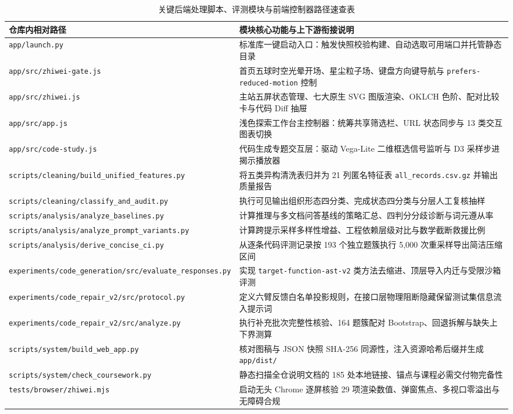 {\setlength{\parfillskip}{0pt plus 1fil}
\begin{table}[!htbp]
\centering
\caption{关键后端处理脚本、评测模块与前端控制器路径速查表}\label{tab:app-g-modmap}
\ReportTableStyle
\fontsize{9.6bp}{11.8bp}\selectfont
\begin{tabularx}{\linewidth}{@{}>{\raggedright\arraybackslash}p{6.2cm} >{\raggedright\arraybackslash}X@{}}
\toprule
\textbf{仓库内相对路径} & \textbf{模块核心功能与上下游衔接说明} \\
\midrule
\texttt{app/launch.py} & 标准库一键启动入口：触发快照校验构建、自动选取可用端口并托管静态目录 \\
\texttt{app/src/zhiwei-gate.js} & 首页五球时空光晕开场、星尘粒子场、键盘方向键导航与 \texttt{prefers-reduced-motion} 控制 \\
\texttt{app/src/zhiwei.js} & 主站五屏状态管理、七大原生 SVG 图版渲染、OKLCH 色阶、配对比较卡与代码 Diff 抽屉 \\
\texttt{app/src/app.js} & 浅色探索工作台主控制器：统筹共享筛选栏、URL 状态同步与 13 类交互图表切换 \\
\texttt{app/src/code-study.js} & 代码生成专题交互层：驱动 Vega-Lite 二维框选信号监听与 D3 采样步进揭示播放器 \\
\texttt{scripts/cleaning/build\_unified\_features.py} & 将五类异构清洗表归并为 21 列匿名特征表 \texttt{all\_records.csv.gz} 并输出质量报告 \\
\texttt{scripts/cleaning/classify\_and\_audit.py} & 执行可见输出组织形态四分类、完成状态四分类与分层人工复核抽样 \\
\texttt{scripts/analysis/analyze\_baselines.py} & 计算推理与多文档问答基线的策略汇总、四判分分歧诊断与词元遵从率 \\
\texttt{scripts/analysis/analyze\_prompt\_variants.py} & 计算跨提示采样多样性增益、工程依赖层级对比与数学截断救援比例 \\
\texttt{scripts/analysis/derive\_concise\_ci.py} & 从逐条代码评测记录按 193 个独立题簇执行 5,000 次重采样导出简洁压缩区间 \\
\texttt{experiments/code\_generation/src/evaluate\_responses.py} & 实现 \texttt{target-function-ast-v2} 类方法去缩进、顶层导入内迁与受限沙箱评测 \\
\texttt{experiments/code\_repair\_v2/src/protocol.py} & 定义六臂反馈白名单投影规则，在接口层物理阻断隐藏保留测试集信息流入提示词 \\
\texttt{experiments/code\_repair\_v2/src/analyze.py} & 执行补充批次完整性核验、164 题簇配对 Bootstrap、回退拆解与缺失上下界测算 \\
\texttt{scripts/system/build\_web\_app.py} & 核对图稿与 JSON 快照 SHA-256 同源性，注入资源哈希后缀并生成 \texttt{app/dist/} \\
\texttt{scripts/system/check\_coursework.py} & 静态扫描全仓说明文档的 185 处本地链接、锚点与课程必需交付物完备性 \\
\texttt{tests/browser/zhiwei.mjs} & 启动无头 Chrome 逐屏核验 29 项渲染数值、弹窗焦点、多视口零溢出与无障碍合规 \\
\bottomrule
\end{tabularx}
\end{table}}

